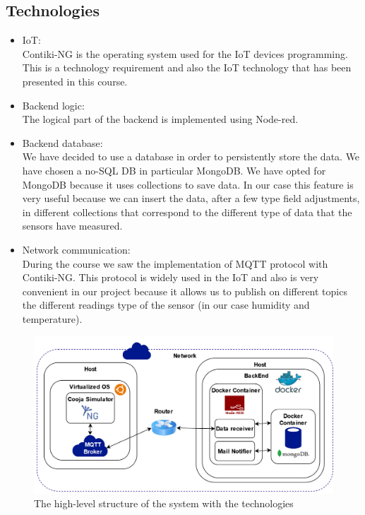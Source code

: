 \documentclass[11pt]{article}
\begin{document}
\subsection{Technologies}
\begin{itemize}
    \item IoT: \\
    Contiki-NG is the operating system used for the IoT devices programming. This is a technology requirement and also the IoT technology that has been presented in this course.
    \item Backend logic: \\
    The logical part of the backend is implemented using Node-red.
    \item Backend database: \\
    We have decided to use a database in order to persistently store the data. We have chosen a no-SQL DB in particular MongoDB. We have opted for MongoDB because it uses collections to save data. In our case this feature is very useful because we can insert the data, after a few type field adjustments, in different collections that correspond to the different type of data that the sensors have measured.
    \item Network communication: \\
    During the course we saw the implementation of MQTT protocol with Contiki-NG. This protocol is widely used in the IoT and also is very convenient in our project because it allows us to publish on different topics the different readings type of the sensor (in our case humidity and temperature).
\end{itemize}
\begin{figure}[h]
    \centering
    \includegraphics[width=15cm]{resources/Technologies.png}
    \caption{The high-level structure of the system with the technologies}
\end{figure}
\end{document}
